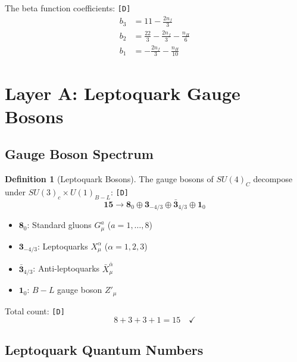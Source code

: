 \documentclass[11pt,a4paper]{article}
\newcommand{\tagD}{\textcolor{green!50!black}{\texttt{[D]}}}
\theoremstyle{definition}
\newtheorem{definition}{Definition}[section]
\begin{document}
The beta function coefficients: \tagD{}
\begin{align}
\label{eq:beta-su3}
b_3 &= 11 - \frac{2n_f}{3} \\
\label{eq:beta-su2}
b_2 &= \frac{22}{3} - \frac{2n_f}{3} - \frac{n_H}{6} \\
\label{eq:beta-u1}
b_1 &= -\frac{2n_f}{3} - \frac{n_H}{10}
\end{align}

\section{Layer A: Leptoquark Gauge Bosons}
\label{sec:leptoquarks}

\subsection{Gauge Boson Spectrum}
\label{subsec:boson-spectrum}

\begin{definition}[Leptoquark Bosons]
\label{def:leptoquarks}
The gauge bosons of $SU(4)_C$ decompose under $SU(3)_c \times U(1)_{B-L}$: \tagD{}
\begin{equation}
\label{eq:boson-decomposition}
\mathbf{15} \to \mathbf{8}_0 \oplus \mathbf{3}_{-4/3} \oplus \bar{\mathbf{3}}_{4/3} \oplus \mathbf{1}_0
\end{equation}
\end{definition}

\begin{itemize}
  \item $\mathbf{8}_0$: Standard gluons $G^a_\mu$ ($a = 1, \ldots, 8$)
  \item $\mathbf{3}_{-4/3}$: Leptoquarks $X^{\alpha}_\mu$ ($\alpha = 1, 2, 3$)
  \item $\bar{\mathbf{3}}_{4/3}$: Anti-leptoquarks $\bar{X}^{\bar{\alpha}}_\mu$
  \item $\mathbf{1}_0$: $B - L$ gauge boson $Z'_\mu$
\end{itemize}

Total count: \tagD{}
\begin{equation}
\label{eq:boson-count}
8 + 3 + 3 + 1 = 15 \quad \checkmark
\end{equation}

\subsection{Leptoquark Quantum Numbers}
\label{subsec:lq-quantum}
\end{document}
